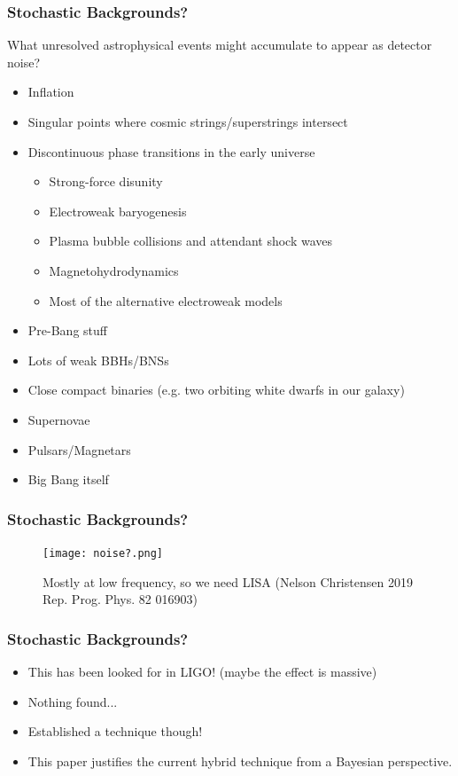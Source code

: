 \documentclass[10pt]{beamer}
\begin{document}
\begin{frame}
  \frametitle{Stochastic Backgrounds?}
  What unresolved astrophysical events might accumulate to appear as detector noise?
  \begin{itemize}
  \item Inflation
  \item Singular points where cosmic strings/superstrings intersect
  \item Discontinuous phase transitions in the early universe
    \begin{itemize}
    \item Strong-force disunity
    \item Electroweak baryogenesis
    \item Plasma bubble collisions and attendant shock waves
    \item Magnetohydrodynamics
    \item Most of the alternative electroweak models
    \end{itemize}
  \item Pre-Bang stuff
  \item Lots of weak BBHs/BNSs
  \item Close compact binaries (e.g. two orbiting white dwarfs in our galaxy)
  \item Supernovae
  \item Pulsars/Magnetars
  \item Big Bang itself

  \end{itemize}
\end{frame}
\begin{frame}
  \frametitle{Stochastic Backgrounds?}
  \begin{figure}
    \centering
    \texttt{[image: noise?.png]}
    \caption*{Mostly at low frequency, so we need LISA (Nelson Christensen 2019 Rep. Prog. Phys. 82 016903)}
  \end{figure}
\end{frame}

\begin{frame}
  \frametitle{Stochastic Backgrounds?}
  \begin{itemize}
  \item This has been looked for in LIGO! (maybe the effect is massive)
  \item Nothing found...
  \item Established a technique though!
  \item This paper justifies the current hybrid technique from a Bayesian perspective.
  \end{itemize}
\end{frame}
\end{document}
